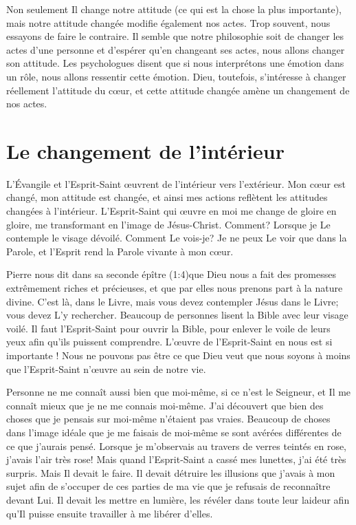 Non seulement Il change notre attitude (ce qui est la chose la plus importante),
 mais notre attitude changée modifie également nos actes.
 Trop souvent, nous essayons de faire le contraire.
 Il semble que notre philosophie soit de changer les actes d'une personne
 et d'espérer qu'en changeant ses actes, nous allons changer son attitude.
 Les psychologues disent que si nous interprétons une émotion dans un rôle, nous allons ressentir
 cette émotion.
 Dieu, toutefois, s'intéresse à changer réellement l'attitude du cœur,
 et cette attitude changée amène un changement de nos actes.


\section{Le changement de l'int\'erieur}

L'Évangile et l'Esprit-Saint œuvrent de l'intérieur vers l'exté\-rieur.
 Mon cœur est changé, mon attitude est changée,
 et ainsi mes actions reflètent les attitudes changées à l'intérieur.
 L'Esprit-Saint qui œuvre en moi me change de gloire en gloire,
 me transformant en l'image de Jésus-Christ. Comment?
 Lorsque je Le contemple le visage dévoilé.
 Comment Le vois-je? Je ne peux Le voir que dans la Parole,
 et l'Esprit rend la Parole vivante à mon cœur.

Pierre nous dit dans sa seconde épître
 (1:4)que Dieu nous a fait
 des promesses extrêmement riches et précieuses,
 et que par elles nous prenons part à la nature divine.
 C'est là, dans le Livre, mais vous devez contempler Jésus dans le Livre;
 vous devez L'y rechercher.
 Beaucoup de personnes lisent la Bible avec leur visage voilé.
 Il faut l'Esprit-Saint pour ouvrir la Bible, pour enlever le voile
 de leurs yeux afin qu'ils puissent comprendre.
 L'œuvre de l'Esprit-Saint en nous est si importante !
 Nous ne pouvons pas être ce que Dieu veut que nous soyons
 à moins que l'Esprit-Saint n'\oe{}uvre au sein de notre vie.

Personne ne me connaît aussi bien que moi-même, si ce n'est le Seigneur,
 et Il me connaît mieux que je ne me connais moi-même.
 J'ai découvert que bien des choses que je pensais
 sur moi-même n'étaient pas vraies.
 Beaucoup de choses dans l'image idéale que je me faisais de moi-même
 se sont avérées différentes de ce que j'aurais pensé.
 Lorsque je m'observais au travers de verres teintés en rose,
 j'avais l'air très rose!
 Mais quand l'Esprit-Saint a cassé mes lunettes,
 j'ai été très surpris. Mais Il devait le faire.
 Il devait détruire les illusions que j'avais à mon sujet afin de s'occuper
 de ces parties de ma vie que je refusais de reconnaître devant Lui.
 Il devait les mettre en lumière, les révéler dans toute leur laideur
 afin qu'Il puisse ensuite travailler à me libérer d'elles.


